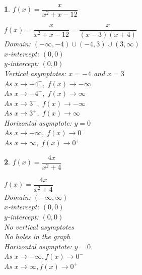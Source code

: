 \documentclass{amsbook}
\newtheorem{exc}{}
\newenvironment{ex}{\begin{exc}\normalfont}{\end{exc}}
\numberwithin{section}{chapter}
\numberwithin{equation}{chapter}
\begin{document}
\begin{multicols}{2}
\begin{ex}
		$f(x) = \dfrac{x}{x^{2} + x - 12} $
	\begin{sol}
		$f(x) = \dfrac{x}{x^{2} + x - 12} = \dfrac{x}{(x - 3)(x + 4)}$\\
		Domain: $(-\infty, -4) \cup (-4, 3) \cup (3, \infty)$\\
		$x$-intercept: $(0, 0)$\\
		$y$-intercept: $(0, 0)$\\
		Vertical asymptotes: $x = -4$ and $x = 3$\\
		As $x \rightarrow -4^{-}, \; f(x) \rightarrow -\infty$\\
		As $x \rightarrow -4^{+}, \; f(x) \rightarrow \infty$\\
		As $x \rightarrow 3^{-}, \; f(x) \rightarrow -\infty$\\
		As $x \rightarrow 3^{+}, \; f(x) \rightarrow \infty$\\
		Horizontal asymptote: $y = 0$\\
		As $x \rightarrow -\infty, \; f(x) \rightarrow 0^{-}$\\
		As $x \rightarrow \infty, \; f(x) \rightarrow 0^{+}$\
	\end{sol}
\end{ex}

\begin{ex}
		$f(x) = \dfrac{4x}{x^{2} + 4}$
	\begin{sol}
		$f(x) = \dfrac{4x}{x^{2} + 4}$\\
		Domain: $(-\infty,  \infty)$\\
		$x$-intercept:  $(0,0)$\\
		$y$-intercept:  $(0,0)$\\
		No vertical asymptotes \\
		No holes in the graph\\
		Horizontal asymptote: $y = 0$ \\
		As $x \rightarrow -\infty, f(x) \rightarrow 0^{-}$\\
		As $x \rightarrow \infty, f(x) \rightarrow 0^{+}$
	\end{sol}
\end{ex}


\end{multicols}
\end{document}
